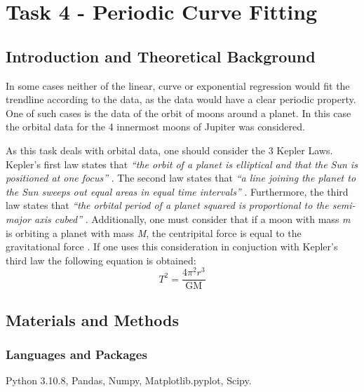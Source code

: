 \documentclass[12pt, a4paper]{article}
\begin{document}
\section{Task 4 - Periodic Curve Fitting}

\subsection{Introduction and Theoretical Background}
In some cases neither of the linear, curve or exponential regression would fit the trendline according to the data, as the data would have a clear periodic property. One of such cases is the data of the orbit of moons around a planet. In this case the orbital data for the 4 innermost moons of Jupiter was considered. 

As this task deals with orbital data, one should consider the 3 Kepler Laws. Kepler's first law states that \textit{``the orbit of a planet is elliptical and that the Sun is positioned at one focus''} \parencite{muncaster}. The second law states that \textit{``a line joining the planet to the Sun sweeps out equal areas in equal time
intervals''} \parencite{muncaster}. Furthermore, the third law states that \textit{``the orbital period of a planet squared is proportional to the semi-major axis
cubed''} \parencite{muncaster}. Additionally, one must consider that if a moon with mass \textit{m} is orbiting a planet with mass \textit{M}, the centripital force is equal to the gravitational force \parencite{muncaster}. If one uses this consideration in conjuction with Kepler's third law the following equation is obtained:
\begin{equation}
    T^2 = \frac{4\pi^2r^3}{\mathrm{GM}}
    \label{eq: equation 4.1}
\end{equation}

\subsection{Materials and Methods}
\subsubsection{Languages and Packages}
Python 3.10.8, Pandas, Numpy, Matplotlib.pyplot, Scipy.
\end{document}

